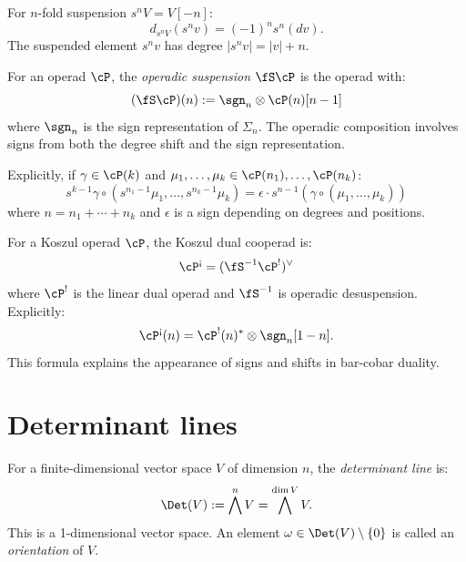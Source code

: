 \begin{corollary}
\label{cor:iterated-susp}
For $n$-fold suspension $s^n V = V[-n]$:
\[
d_{s^n V}(s^n v) = (-1)^n s^n(dv).
\]
The suspended element $s^n v$ has degree $|s^n v| = |v| + n$.
\end{corollary}

\begin{definition}
\label{def:susp-operadic}
For an operad $\cP$, the \emph{operadic suspension} $\fS \cP$ is the operad with:
\[
(\fS \cP)(n) := \sgn_n \otimes \cP(n)[n-1]
\]
where $\sgn_n$ is the sign representation of $\Sigma_n$. The operadic composition
involves signs from both the degree shift and the sign representation.

Explicitly, if $\gamma \in \cP(k)$ and $\mu_1, \ldots, \mu_k \in \cP(n_1), \ldots, \cP(n_k)$:
\[
s^{k-1}\gamma \circ (s^{n_1-1}\mu_1, \ldots, s^{n_k-1}\mu_k)
= \epsilon \cdot s^{n-1}(\gamma \circ (\mu_1, \ldots, \mu_k))
\]
where $n = n_1 + \cdots + n_k$ and $\epsilon$ is a sign depending on degrees
and positions.
\end{definition}

\begin{proposition}
\label{prop:susp-koszul}
For a Koszul operad $\cP$, the Koszul dual cooperad is:
\[
\cP^{\scriptstyle \text{\textexclamdown}} = (\fS^{-1} \cP^!)^\vee
\]
where $\cP^!$ is the linear dual operad and $\fS^{-1}$ is operadic desuspension.
Explicitly:
\[
\cP^{\scriptstyle \text{\textexclamdown}}(n) = \cP^!(n)^* \otimes \sgn_n[1-n].
\]
This formula explains the appearance of signs and shifts in bar-cobar duality.
\end{proposition}


\section{Determinant lines}
\label{sec:det-lines}

\begin{definition}
\label{def:det-vect}
For a finite-dimensional vector space $V$ of dimension $n$, the
\emph{determinant line} is:
\[
\Det(V) := \bigwedge^n V = \bigwedge^{\dim V} V.
\]
This is a 1-dimensional vector space. An element $\omega \in \Det(V) \setminus \{0\}$
is called an \emph{orientation} of $V$.
\end{definition}

